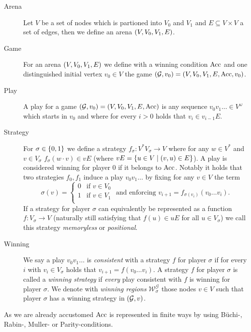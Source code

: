 \begin{definition}
  \begin{description}
    \item [Arena] Let $V$ be a set of nodes which is partioned into $V_{0}$ and
      $V_{1}$ and $E\subseteq V\times V$ a set of edges, then we define an
      arena $\left(V, V_{0}, V_{1}, E\right)$.
    \item [Game] For an arena $\left(V, V_{0}, V_{1}, E\right)$ we define with a
      winning condition $\operatorname{Acc}$ and one distinguished initial vertex
      $v_{0}\in V$ the game
      $\left(\mathcal{G}, v_{0}\right) = \left(V, V_{0}, V_{1}, E, \operatorname{Acc}, v_{0}\right)$.
    \item [Play] A play for a game $\left(\mathcal{G}, v_{0}\right) = \left(V,
      V_{0}, V_{1}, E, \operatorname{Acc}\right)$ is any sequence $v_{0}v_{1}\dots\in
      V^{\omega}$ which starts in $v_{0}$ and where for every $i > 0$ holds
      that $v_{i}\in v_{i-1}E$.
    \item [Strategy] For $\sigma\in\left\{0,1\right\}$ we define a strategy
      $f_{\sigma}: V^{*}V_{\sigma}\rightarrow V$ where for any $w\in V^{*}$ and
      $v\in V_{\sigma}$ $f_{\sigma}(w\cdot v)\in vE$ (where $vE =
      \left\{u\in V\mid\left(v,u\right)\in E\right\}$). A play is considered winning for
      player $0$ if it belongs to $\operatorname{Acc}$. Notably it holds that two strategies
      $f_{0}, f_{1}$ induce a play $v_{0}v_{1}\dots$ by fixing for any $v\in V$
      the term
      \begin{equation*}
        \sigma(v) = \begin{cases}
          0&\text{if }v\in V_{0}\\
          1&\text{if }v\in V_{1}\\
        \end{cases}\text{ and enforcing }
        v_{i+1} = f_{\sigma(v_{i})}(v_{0}\dots v_{i}).
      \end{equation*}
      If a strategy for player $\sigma$ can equivalently be represented as a
      function $f:V_{\sigma}\rightarrow V$ (naturally still satisfying that
      $f(u)\in uE$ for all $u\in V_{\sigma}$) we call this strategy
      \emph{memoryless} or \emph{positional}.
    \item [Winning] We say a play $v_{0}v_{1}\dots$ is \emph{consistent} with a
      strategy $f$ for player $\sigma$ if for every $i$ with
      $v_{i}\in V_{\sigma}$ holds that $v_{i+1} = f(v_{0}\dots v_{i})$. 
      A strategy $f$ for player $\sigma$ is called a \emph{winning strategy} if
      \emph{every} play consistent with $f$ is winning for player $\sigma$.
      We denote with \emph{winning regions}
      $\mathcal{W}^{\mathcal{G}}_{\sigma}$ those nodes $v\in V$ such that
      player $\sigma$ has a winning strategy in $\left(\mathcal{G}, v\right)$.
  \end{description}
  As we are already accustomed $\operatorname{Acc}$ is represented in finite ways by using
  Büchi-, Rabin-, Muller- or Parity-conditions.
\end{definition}
